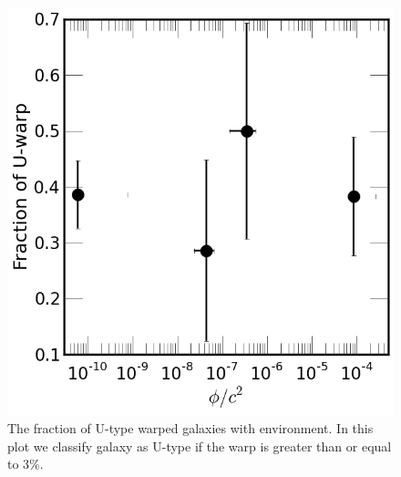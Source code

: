 \documentclass[useAMS,usenatbib,twocolumn]{mn2e}
\begin{document}
\begin{figure}
\begin{center}
\includegraphics[scale=0.35]{figures/warp-frac-vs-environ.png}
\caption{The fraction of U-type warped galaxies with environment. In this plot
we classify galaxy as U-type if the warp is greater than or equal to 3\%.
}
\label{fig:warp-stren-frac}
\end{center}
\end{figure}
\end{document}
